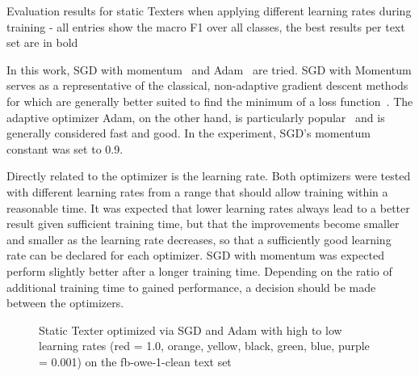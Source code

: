 
\begin{table}[t]
    \centering
    
    \caption{Evaluation results for static Texters when applying different learning rates during training - all entries show the macro F1 over all classes, the best results per text set are in bold}
    \label{tab:5_experiments/3_texter/2_static/8_optimizer/grid_search}
\end{table}

In this work, SGD with momentum~\cite{Qian1999OnTM} and Adam~\cite{Kingma2015AdamAM} are tried. SGD with Momentum serves as a representative of the classical, non-adaptive gradient descent methods for which are generally better suited to find the minimum of a loss function~\cite{Wilson2017TheMV}. The adaptive optimizer Adam, on the other hand, is particularly popular~\cite{AdamPopular} and is generally considered fast and good. In the experiment, SGD's momentum constant was set to 0.9.

Directly related to the optimizer is the learning rate. Both optimizers were tested with different learning rates from a range that should allow training within a reasonable time. It was expected that lower learning rates always lead to a better result given sufficient training time, but that the improvements become smaller and smaller as the learning rate decreases, so that a sufficiently good learning rate can be declared for each optimizer. SGD with momentum was expected perform slightly better after a longer training time. Depending on the ratio of additional training time to gained performance, a decision should be made between the optimizers.

\begin{figure}[t]
    \centering
    
    \caption{Static Texter optimized via SGD and Adam with high to low learning rates (red = 1.0, orange, yellow, black, green, blue, purple = 0.001) on the fb-owe-1-clean text set}
    \label{fig:5_experiments/3_texter/2_static/8_optimizer/sgd_vs_adam/sgd_vs_adam}
\end{figure}

